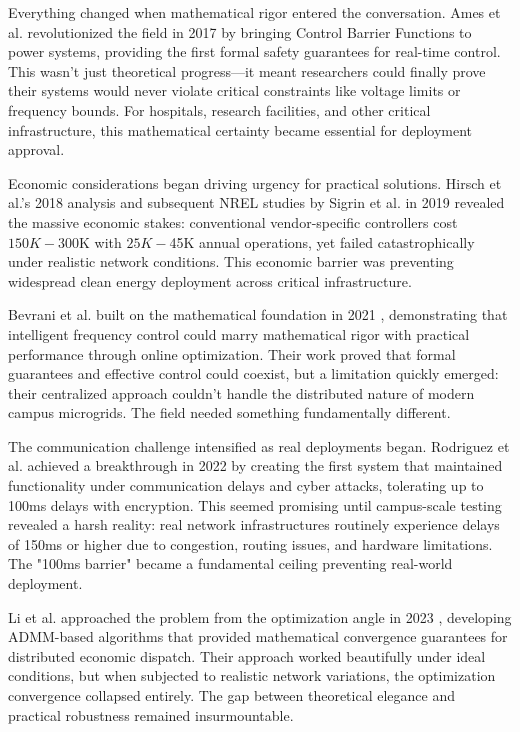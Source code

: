 \documentclass[12pt]{article}
\begin{document}
Everything changed when mathematical rigor entered the conversation. Ames et al. revolutionized the field in 2017 \cite{ames2017} by bringing Control Barrier Functions to power systems, providing the first formal safety guarantees for real-time control. This wasn't just theoretical progress—it meant researchers could finally prove their systems would never violate critical constraints like voltage limits or frequency bounds. For hospitals, research facilities, and other critical infrastructure, this mathematical certainty became essential for deployment approval.

Economic considerations began driving urgency for practical solutions. Hirsch et al.'s 2018 analysis \cite{hirsch2018} and subsequent NREL studies by Sigrin et al. in 2019 \cite{sigrin2019} revealed the massive economic stakes: conventional vendor-specific controllers cost $150K-$300K with $25K-$45K annual operations, yet failed catastrophically under realistic network conditions. This economic barrier was preventing widespread clean energy deployment across critical infrastructure.

Bevrani et al. built on the mathematical foundation in 2021 \cite{bevrani2021}, demonstrating that intelligent frequency control could marry mathematical rigor with practical performance through online optimization. Their work proved that formal guarantees and effective control could coexist, but a limitation quickly emerged: their centralized approach couldn't handle the distributed nature of modern campus microgrids. The field needed something fundamentally different.

The communication challenge intensified as real deployments began. Rodriguez et al. achieved a breakthrough in 2022 \cite{rodriguez2022} by creating the first system that maintained functionality under communication delays and cyber attacks, tolerating up to 100ms delays with encryption. This seemed promising until campus-scale testing revealed a harsh reality: real network infrastructures routinely experience delays of 150ms or higher due to congestion, routing issues, and hardware limitations. The "100ms barrier" became a fundamental ceiling preventing real-world deployment.

Li et al. approached the problem from the optimization angle in 2023 \cite{li2023}, developing ADMM-based algorithms that provided mathematical convergence guarantees for distributed economic dispatch. Their approach worked beautifully under ideal conditions, but when subjected to realistic network variations, the optimization convergence collapsed entirely. The gap between theoretical elegance and practical robustness remained insurmountable.
\end{document}
